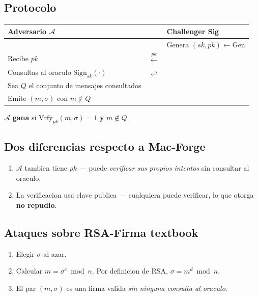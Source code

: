 \documentclass[a4paper,11pt]{article}
\begin{document}
\vspace{0.5cm}

\subsection{Protocolo}

\begin{center}
\begin{tabular}{ACB}
\toprule
\textbf{Adversario $\mathcal{A}$} & & \textbf{Challenger Sig} \\
\midrule
 & & Genera $(sk, pk) \leftarrow \mathrm{Gen}$ \\
Recibe $pk$ & $\xleftarrow{pk}$ & \\
Consultas al oraculo $\mathrm{Sign}_{sk}(\cdot)$ & $\rightleftharpoons$ & \\
Sea $Q$ el conjunto de mensajes consultados & & \\
Emite $(m, \sigma)$ con $m \notin Q$ & & \\
\bottomrule
\end{tabular}
\end{center}

\vspace{0.3cm}
$\mathcal{A}$ \textbf{gana} si $\mathrm{Vrfy}_{pk}(m, \sigma) = 1$ \textbf{y} $m \notin Q$.

\subsection{Dos diferencias respecto a Mac-Forge}

\begin{enumerate}[leftmargin=*, label=\textbf{\arabic*.}]
  \item $\mathcal{A}$ tambien tiene $pk$ --- puede \emph{verificar sus propios intentos} sin consultar al oraculo.
  \item La verificacion usa clave publica --- cualquiera puede verificar, lo que otorga \textbf{no repudio}.
\end{enumerate}

\subsection{Ataques sobre RSA-Firma textbook}

\begin{attackbox}[title={Patron de Ataque -- RSA: Ataque sin mensajes (no-message attack)}]
\begin{enumerate}[leftmargin=*, label=\textbf{\arabic*.}]
  \item Elegir $\sigma$ al azar.
  \item Calcular $m = \sigma^e \bmod n$. Por definicion de RSA, $\sigma = m^d \bmod n$.
  \item El par $(m, \sigma)$ es una firma valida \emph{sin ninguna consulta al oraculo}.
\end{enumerate}
\end{attackbox}
\end{document}
